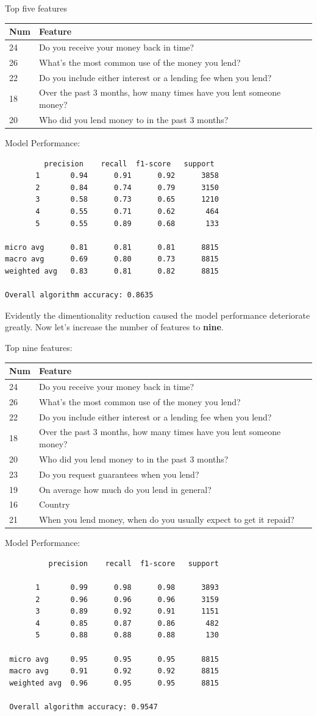 Top five features

\begin{longtable}[]{@{}ll@{}}
\toprule
Num & Feature\tabularnewline
\midrule
\endhead
24 & Do you receive your money back in time?\tabularnewline
26 & What's the most common use of the money you lend?\tabularnewline
22 & Do you include either interest or a lending fee when you
lend?\tabularnewline
18 & Over the past 3 months, how many times have you lent someone
money?\tabularnewline
20 & Who did you lend money to in the past 3 months?\tabularnewline
\bottomrule
\end{longtable}

Model Performance:

\begin{verbatim}
         precision    recall  f1-score   support
       1       0.94      0.91      0.92      3858
       2       0.84      0.74      0.79      3150
       3       0.58      0.73      0.65      1210
       4       0.55      0.71      0.62       464
       5       0.55      0.89      0.68       133

micro avg      0.81      0.81      0.81      8815
macro avg      0.69      0.80      0.73      8815
weighted avg   0.83      0.81      0.82      8815

Overall algorithm accuracy: 0.8635
\end{verbatim}

Evidently the dimentionality reduction caused the model performance
deteriorate greatly. Now let's increase the number of features to
\textbf{nine}.

Top nine features:

\begin{longtable}[]{@{}ll@{}}
\toprule
Num & Feature\tabularnewline
\midrule
\endhead
24 & Do you receive your money back in time?\tabularnewline
26 & What's the most common use of the money you lend?\tabularnewline
22 & Do you include either interest or a lending fee when you
lend?\tabularnewline
18 & Over the past 3 months, how many times have you lent someone
money?\tabularnewline
20 & Who did you lend money to in the past 3 months?\tabularnewline
23 & Do you request guarantees when you lend?\tabularnewline
19 & On average how much do you lend in general?\tabularnewline
16 & Country\tabularnewline
21 & When you lend money, when do you usually expect to get it
repaid?\tabularnewline
\bottomrule
\end{longtable}

Model Performance:

\begin{verbatim}
          precision    recall  f1-score   support

       1       0.99      0.98      0.98      3893
       2       0.96      0.96      0.96      3159
       3       0.89      0.92      0.91      1151
       4       0.85      0.87      0.86       482
       5       0.88      0.88      0.88       130

 micro avg     0.95      0.95      0.95      8815
 macro avg     0.91      0.92      0.92      8815
 weighted avg  0.96      0.95      0.95      8815
 
 Overall algorithm accuracy: 0.9547
\end{verbatim}

